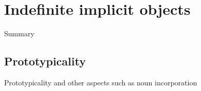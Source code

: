 \setchapterpreamble[u]{\margintoc}
\chapter{Indefinite implicit objects}

Summary

\section{Prototypicality} 

Prototypicality and other aspects such as noun incorporation
